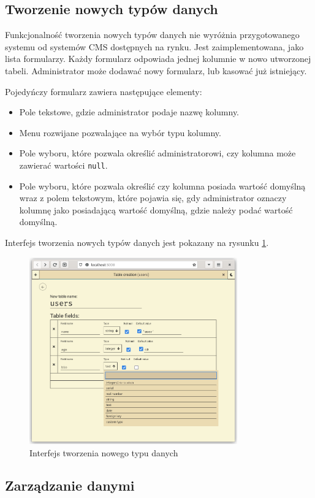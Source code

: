 \subsection{Tworzenie nowych typów danych}

Funkcjonalność tworzenia nowych typów danych nie wyróżnia przygotowanego systemu
od systemów CMS dostępnych na rynku. Jest zaimplementowana, jako lista
formularzy. Każdy formularz odpowiada jednej kolumnie w nowo utworzonej tabeli.
Administrator może dodawać nowy formularz, lub kasować już istniejący.

Pojedyńczy formularz zawiera następujące elementy:

\begin{itemize}

    \item Pole tekstowe, gdzie administrator podaje nazwę kolumny.

    \item Menu rozwijane pozwalające na wybór typu kolumny.

    \item Pole wyboru, które pozwala określić administratorowi, czy kolumna może
    zawierać wartości \verb|null|.

    \item Pole wyboru, które pozwala określić czy kolumna posiada wartość
    domyślną wraz z polem tekstowym, które pojawia się, gdy administrator
    oznaczy kolumnę jako posiadającą wartość domyślną, gdzie należy podać
    wartość domyślną.

\end{itemize}

Interfejs tworzenia nowych typów danych jest pokazany na rysunku \ref{tableCreationFigure}.

\begin{figure}[h]
    \centering
    \includegraphics[width=0.8\textwidth]{./img/table_creation.png}
    \caption{Interfejs tworzenia nowego typu danych}
    \label{tableCreationFigure}
\end{figure}

\subsection{Zarządzanie danymi}
